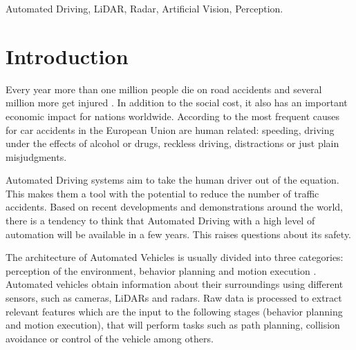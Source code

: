 \documentclass[journal]{IEEEtran}
\begin{document}
\begin{IEEEkeywords}
Automated Driving, LiDAR, Radar, Artificial Vision, Perception.
\end{IEEEkeywords}






%
\IEEEpeerreviewmaketitle




\section{Introduction}
\label{sec:01-intro}

Every year more than one million people die on road accidents and several 
million more get injured \cite{world2015global}. In addition to the social cost, it also has an
important economic impact for nations worldwide. According to 
\cite{Thomas2013} the most frequent causes for car accidents in the
European Union are human related: speeding, driving under the effects of
alcohol or drugs, reckless driving, distractions or just plain misjudgments.

Automated Driving systems aim to take the human driver out of the equation. 
This makes them a tool with the potential to reduce the number of traffic 
accidents.
Based on recent developments and demonstrations around the world, there is a 
tendency to think that Automated Driving with a high level of automation will 
be available in a few years. This raises questions about its safety. 

The architecture of Automated Vehicles is usually divided into three 
categories: perception of the environment, behavior planning and motion 
execution \cite{behere2015functional}. Automated 
vehicles obtain information about their surroundings using different
sensors, such as cameras, LiDARs and radars. Raw data is processed to extract
relevant features which are the input to the following stages (behavior
planning and motion execution), that will perform tasks such as path planning,
collision avoidance or control of the vehicle among others. 
\end{document}
